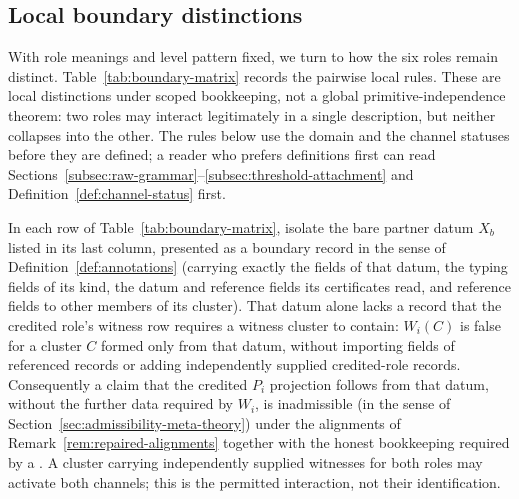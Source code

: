\subsection{Local boundary distinctions}\label{subsec:boundary-matrix}

With role meanings and level pattern fixed, we turn to how the six
roles remain distinct. Table~\ref{tab:boundary-matrix} records the
pairwise local rules. These are local distinctions under scoped
bookkeeping, not a global primitive-independence theorem: two roles
may interact legitimately in a single description, but neither
collapses into the other. The rules below use the domain \FATCD{} and the
channel statuses before they are defined; a reader who prefers definitions
first can read Sections~\ref{subsec:raw-grammar}--\ref{subsec:threshold-attachment}
and Definition~\ref{def:channel-status} first.



\begin{proposition}\label{prop:boundary-distinctions}
In each row of Table~\ref{tab:boundary-matrix}, isolate the bare partner
datum \(X_b\) listed in its last column, presented as a boundary record in
the sense of Definition~\ref{def:annotations} (carrying exactly the fields of that
datum, the typing fields of its kind, the datum and reference fields its certificates read, and reference fields to other members of its cluster). That datum alone lacks a record that the credited role's witness row requires a witness cluster to contain: \(W_i(C)\) is false for a cluster \(C\) formed only from that
datum, without importing fields of referenced records or adding
independently supplied credited-role records. Consequently a claim that the credited \(P_i\)
projection follows from that datum, without the further data required by
\(W_i\), is inadmissible (in the sense of Section~\ref{sec:admissibility-meta-theory}) under the alignments of
Remark~\ref{rem:repaired-alignments} together with the honest bookkeeping
required by a \FATCD{}. A cluster carrying independently supplied witnesses
for both roles may activate both channels; this is the permitted interaction,
not their identification.
\end{proposition}

